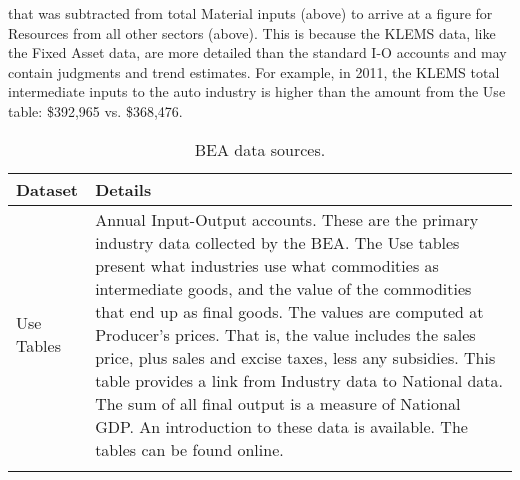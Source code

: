 \begin{longtabu}
{												that was subtracted from total Material 
												inputs (above) to arrive at a figure 
												for Resources from all other sectors (above). 
												This is because the KLEMS data, 
												like the Fixed Asset data, 
												are more detailed than the standard I-O accounts 
												and may contain judgments and trend estimates.  
												For example, in 2011, 
												the KLEMS total intermediate inputs 
												to the auto industry is higher than the amount 
												from the Use table: \$392,965 vs. \$368,476.
												}												\\
\label{tab:auto_calculations}
\end{longtabu}


\begin{table}
\caption[BEA data sources]{BEA data sources.}
\begin{center}
  \begin{tabular}{l @{\hspace{2em}} p{10cm}}
   \toprule 
    Dataset & Details  \\ 

	\midrule
Use Tables 	& 	Annual Input-Output accounts. 
				These are the primary industry data collected by the BEA\@.
				The Use tables present what industries use what commodities 
				as intermediate goods, and the value of the commodities that end up as final goods. 
				The values are computed at Producer’s prices. 
				That is, the value includes the sales price, plus sales and excise taxes, 
				less any subsidies. 
				This table provides a link from Industry data to National data. 
				The sum of all final output is a measure of National GDP\@.
				An introduction to these data is available.\cite{Streitwieser:2011aa}
				The tables can be found online.\cite{BEAIOData}\\
			& 	\\


\end{tabular}
\end{center}
\end{table}
